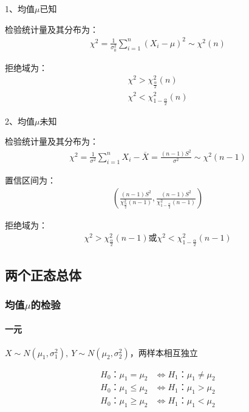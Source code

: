 \documentclass[12pt]{book}
\begin{document}
1、均值$\mu$已知

检验统计量及其分布为：
\begin{gather*}
    \chi^2=\frac{1}{\sigma_0^2}\sum_{i=1}^{n}{(X_i-\mu)^2}\sim \chi^2(n)
\end{gather*}


拒绝域为：
\begin{gather*}
    \chi^2>\chi_{\frac{\alpha}{2}}^{2}(n)\\
    \chi^2<\chi_{1-\frac{\alpha}{2}}^{2}(n)
\end{gather*}


2、均值$\mu$未知

检验统计量及其分布为：
\begin{gather*}
    \chi^2=\frac{1}{\sigma^2}\sum_{i=1}^{n}{X_i- \overline{X}} =\frac{(n-1)S^2}{\sigma^2} \sim \chi^2(n-1)
\end{gather*}


置信区间为：
\begin{gather*}
    \left( \frac{(n-1)S^2}{\chi_{\frac{\alpha}{2}}^{2} (n-1)}, \frac{(n-1)S^2}{\chi_{1-\frac{\alpha}{2}}^{2} (n-1)} \right)
\end{gather*}


拒绝域为：
\begin{gather*}
    \chi^2>\chi_{\frac{\alpha}{2}}^2(n-1) 或 χ^2<χ_{1-\frac{\alpha}{2}}^2(n-1)
\end{gather*}













\subsection{两个正态总体}





\subsubsection{均值$\mu$的检验}

\paragraph{一元}
$X\sim N\left(\mu_1,\sigma_1^2\right),\ Y\sim N\left(\mu_2,\sigma_2^2\right)$，两样本相互独立

\begin{align*}
    H_0：\mu_1=\mu_2    & \Leftrightarrow H_1：\mu_1\neq\mu_2 \\
    H_0：\mu_1\le\mu_2  & \Leftrightarrow H_1：\mu_1>\mu_2    \\
    H_0：\mu_1\geq\mu_2 & \Leftrightarrow H_1：\mu_1<\mu_2
\end{align*}
\end{document}
